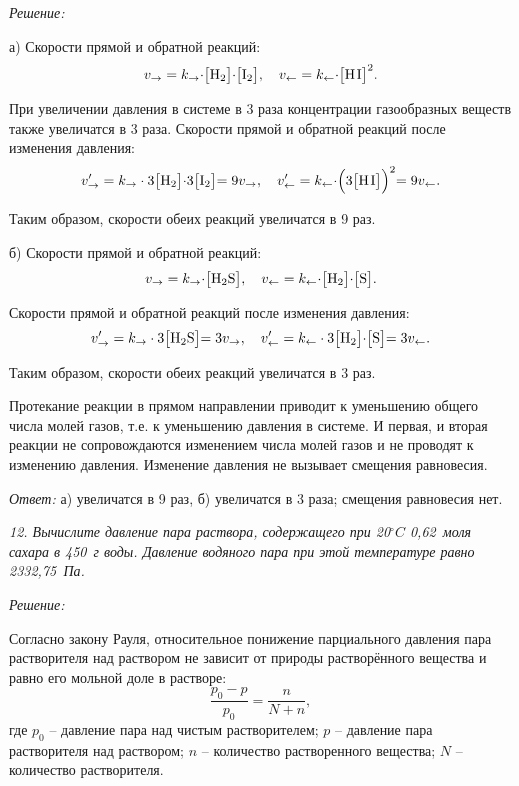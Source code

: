 \vspace*{2em}
\emph{Решение:}

а) Скорости прямой и обратной реакций:
\[
    v_\to = k_\to\cdot\bigr[\mathrm{H_2}\bigl]\cdot\bigr[\mathrm{I_2}\bigl], \quad
    v_\gets = k_\gets\cdot\bigr[\mathrm{H\;\!I}\bigl]^2.
\]

При увеличении давления в системе в 3 раза концентрации газообразных веществ
также увеличатся в 3 раза. Скорости прямой и обратной реакций после изменения
давления:
\[
    v_\to' = k_\to\cdot 3\bigr[\mathrm{H_2}\bigl]\cdot 3\bigr[\mathrm{I_2}\bigl] = 9v_\to, \quad
    v_\gets' = k_\gets\cdot\Bigr(3\bigr[\mathrm{H\;\!I}\bigl]\Bigl)^2 = 9v_\gets.
\]

Таким образом, скорости обеих реакций увеличатся в 9 раз.

б) Скорости прямой и обратной реакций:
\[
    v_\to = k_\to\cdot\bigr[\mathrm{H_2S}\bigl], \quad
    v_\gets = k_\gets\cdot\bigr[\mathrm{H_2}\bigl]\cdot\bigr[\mathrm{S}\bigl].
\]

Скорости прямой и обратной реакций после изменения давления:
\[
    v_\to' = k_\to\cdot 3\bigr[\mathrm{H_2S}\bigl] = 3v_\to, \quad
    v_\gets' = k_\gets\cdot 3\bigr[\mathrm{H_2}\bigl]\cdot\bigr[\mathrm{S}\bigl] = 3v_\gets.
\]

Таким образом, скорости обеих реакций увеличатся в 3 раз.

Протекание реакции в прямом направлении приводит к уменьшению общего числа
молей газов, т.е. к уменьшению давления в системе. И первая, и вторая реакции
не сопровождаются изменением числа молей газов и не проводят к изменению
давления. Изменение давления не вызывает смещения равновесия.

\vspace*{2em}
\emph{Ответ:} а) увеличатся в 9 раз, б) увеличатся в 3 раза; смещения
равновесия нет.

\newpage %

\emph{12. Вычислите давление пара раствора, содержащего при 20\( ^\circ C \)
0,62~моля сахара в 450~г воды. Давление водяного пара при этой температуре
равно 2332,75~Па.}

\vspace*{2em}
\emph{Решение:}

Согласно закону Рауля, относительное понижение парциального давления пара
растворителя над раствором не зависит от природы растворённого вещества и равно
его мольной доле в растворе:
\[
    \frac{p_0 - p}{p_0} = \frac{n}{N + n},
\]
где \( p_0 \) -- давление пара над чистым растворителем;
\( p \) -- давление пара растворителя над раствором;
\( n \) -- количество растворенного вещества;
\( N \) -- количество растворителя.

